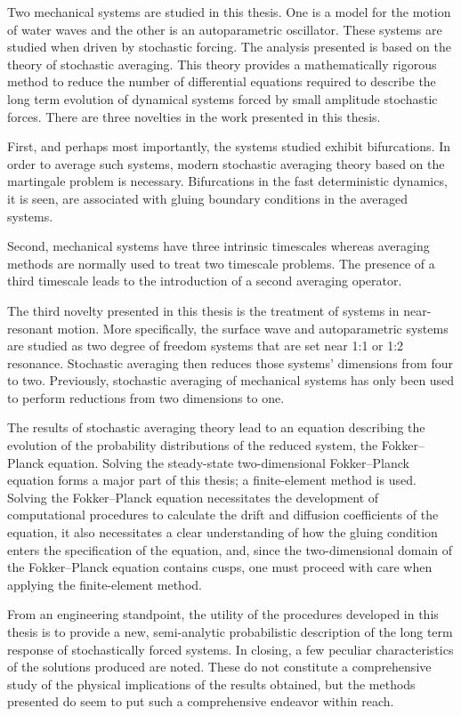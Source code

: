 
Two mechanical systems are studied in this thesis. One is a model for the motion of water waves and the other is an autoparametric oscillator. These systems are studied when driven by stochastic forcing. The analysis presented is based on the theory of stochastic averaging. This theory provides a mathematically rigorous method to reduce the number of differential equations required to describe the long term evolution of dynamical systems forced by small amplitude stochastic forces. There are three novelties in the work presented in this thesis.

First, and perhaps most importantly, the systems studied exhibit bifurcations. In order to average such systems, modern stochastic averaging theory based on the martingale problem is necessary. Bifurcations in the fast deterministic dynamics, it is seen, are associated with gluing boundary conditions in the averaged systems.

Second, mechanical systems have three intrinsic timescales whereas averaging methods are normally used to treat two timescale problems. The presence of a third timescale leads to the introduction of a second averaging operator.

The third novelty presented in this thesis is the treatment of systems in near-resonant motion. More specifically, the surface wave and autoparametric systems are studied as two degree of freedom systems that are set near 1:1 or 1:2 resonance. Stochastic averaging then reduces those systems' dimensions from four to two. Previously, stochastic averaging of mechanical systems has only been used to perform reductions from two dimensions to one.

The results of stochastic averaging theory lead to an equation describing the evolution of the probability distributions of the reduced system, the Fokker--Planck equation. Solving the steady-state two-dimensional Fokker--Planck equation forms a major part of this thesis; a finite-element method is used. Solving the Fokker--Planck equation necessitates the development of computational procedures to calculate the drift and diffusion coefficients of the equation, it also necessitates a clear understanding of how the gluing condition enters the specification of the equation, and, since the two-dimensional domain of the Fokker--Planck equation contains cusps, one must proceed with care when applying the finite-element method.

From an engineering standpoint, the utility of the procedures developed in this thesis is to provide a new, semi-analytic probabilistic description of the long term response of stochastically forced systems. In closing, a few peculiar characteristics of the solutions produced are noted. These do not constitute a comprehensive study of the physical implications of the results obtained, but the methods presented do seem to put such a comprehensive endeavor within reach.

